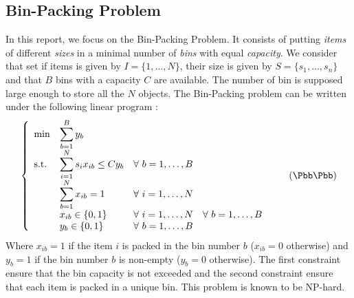\subsection{Bin-Packing Problem}

In this report, we focus on the Bin-Packing Problem. It consists of putting \textit{items} of different \textit{sizes} in a minimal number of \textit{bins} with equal \textit{capacity}. We consider that set if items is given by $I = \{1,\dots,N\}$, their size is given by $S = \{s_1,\dots,s_n\}$ and that $B$ bins with a capacity $C$ are available. The number of bin is supposed large enough to store all the $N$ objects. The Bin-Packing problem can be written under the following linear program :
\begin{equation}
	\label{BPP-classic}
	\left \{
	\begin{array}{*5{>{\displaystyle}l}}
	\min & \sum_{b=1}^B{y_b} \\
	\st & \sum_{i=1}^N s_i x_{ib} \leq C y_b & \forall \ b = 1,\dots,B \\
	& \sum_{b=1}^N x_{ib} = 1 & \forall \ i = 1,\dots,N \\
	& x_{ib} \in \{0,1\} & \forall \ i=1,\dots,N & \forall \ b = 1,\dots,B \\
	& y_{b} \in \{0,1\} &  \forall \ b = 1,\dots,B
	\end{array}
	\right.
	\tag{$\Bbb\Pbb\Pbb$}
\end{equation}
Where $x_{ib}=1$ if the item $i$ is packed in the bin number $b$ ($x_{ib}=0$ otherwise) and $y_b=1$ if the bin number $b$ is non-empty ($y_b=0$ otherwise). The first constraint ensure that the bin capacity is not exceeded and the second constraint ensure that each item is packed in a unique bin. This problem is known to be NP-hard.
